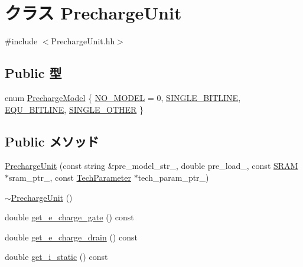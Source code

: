 \hypertarget{classPrechargeUnit}{
\section{クラス PrechargeUnit}
\label{classPrechargeUnit}
}


{\ttfamily \#include $<$PrechargeUnit.hh$>$}\subsection*{Public 型}
\begin{DoxyCompactItemize}
\item 
enum \hyperlink{classPrechargeUnit_a6180eb16d57b141633059448fde14938}{PrechargeModel} \{ \hyperlink{classPrechargeUnit_a6180eb16d57b141633059448fde14938abab57b6e2c553e4d983f415a1f4ea75b}{NO\_\-MODEL} =  0, 
\hyperlink{classPrechargeUnit_a6180eb16d57b141633059448fde14938aff12ef7afbc7067f06d6f3f611a1d8d9}{SINGLE\_\-BITLINE}, 
\hyperlink{classPrechargeUnit_a6180eb16d57b141633059448fde14938ada797519f6f3beaf968b93bff7c0891a}{EQU\_\-BITLINE}, 
\hyperlink{classPrechargeUnit_a6180eb16d57b141633059448fde14938a43382a95830a4cb188a50d3eef7d54f3}{SINGLE\_\-OTHER}
 \}
\end{DoxyCompactItemize}
\subsection*{Public メソッド}
\begin{DoxyCompactItemize}
\item 
\hyperlink{classPrechargeUnit_aceac0549b000908f120a643ad18fed72}{PrechargeUnit} (const string \&pre\_\-model\_\-str\_\-, double pre\_\-load\_\-, const \hyperlink{classSRAM}{SRAM} $\ast$sram\_\-ptr\_\-, const \hyperlink{classTechParameter}{TechParameter} $\ast$tech\_\-param\_\-ptr\_\-)
\item 
\hyperlink{classPrechargeUnit_a59c1c2c5b77e6304677d6f5750a31556}{$\sim$PrechargeUnit} ()
\item 
double \hyperlink{classPrechargeUnit_a699c98317420ea768a113c525e522bca}{get\_\-e\_\-charge\_\-gate} () const 
\item 
double \hyperlink{classPrechargeUnit_a2b5dce20f79e9bff15c7f8d75a6ef27a}{get\_\-e\_\-charge\_\-drain} () const 
\item 
double \hyperlink{classPrechargeUnit_af4ce13e52cccc034f4f0bb0f0a6c9468}{get\_\-i\_\-static} () const 
\end{DoxyCompactItemize}
